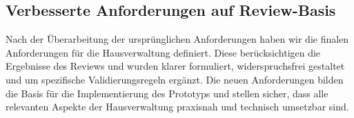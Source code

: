 \newpage
\subsection{Verbesserte Anforderungen auf Review-Basis}


Nach der Überarbeitung der ursprünglichen Anforderungen haben wir die finalen Anforderungen für die Hausverwaltung definiert.
Diese berücksichtigen die Ergebnisse des Reviews und wurden klarer formuliert, widerspruchsfrei gestaltet und um spezifische Validierungsregeln ergänzt.
Die neuen Anforderungen bilden die Basis für die Implementierung des Prototyps und stellen sicher,
dass alle relevanten Aspekte der Hausverwaltung praxisnah und technisch umsetzbar sind.

\footnotesize

